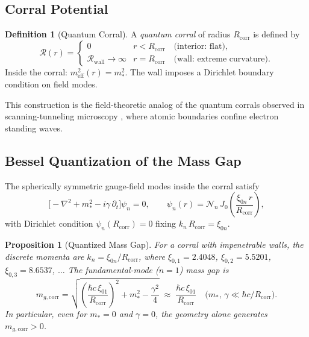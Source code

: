 \documentclass[12pt,a4paper]{article}
\newtheorem{proposition}[theorem]{Proposition}
\theoremstyle{definition}
\newtheorem{definition}[theorem]{Definition}
\newcommand{\mgcorr}{m_{g,\mathrm{corr}}}
\newcommand{\Rcorr}{R_{\mathrm{corr}}}
\newcommand{\meff}{m_{\mathrm{eff}}}
\begin{document}
\subsection{Corral Potential}

\begin{definition}[Quantum Corral]
\label{def:corral}
A \emph{quantum corral} of radius $\Rcorr$ is defined by
\begin{equation}
  \mathcal{R}(r) =
  \begin{cases}
    0 & r < \Rcorr \quad \text{(interior: flat)},\\[4pt]
    \mathcal{R}_{\mathrm{wall}} \to \infty
      & r = \Rcorr \quad \text{(wall: extreme curvature)}.
  \end{cases}
  \label{eq:corral_potential}
\end{equation}
Inside the corral: $\meff^{2}(r) = m_{*}^{2}$.
The wall imposes a Dirichlet boundary condition on field modes.
\end{definition}

This construction is the field-theoretic analog of the quantum corrals
observed in scanning-tunneling microscopy \cite{Crommie1993}, where atomic
boundaries confine electron standing waves.

\subsection{Bessel Quantization of the Mass Gap}

The spherically symmetric gauge-field modes inside the corral satisfy
\begin{equation}
  \bigl[-\nabla^{2} + m_{*}^{2} - i\gamma\,\partial_{t}\bigr]\psi_{n} = 0,
  \qquad
  \psi_{n}(r) = \mathcal{N}_{n}\,J_{0}\!\left(
    \frac{\xi_{0n}\,r}{\Rcorr}
  \right),
  \label{eq:bessel_eq}
\end{equation}
with Dirichlet condition $\psi_{n}(\Rcorr) = 0$ fixing
$k_{n}\,\Rcorr = \xi_{0n}$.

\begin{proposition}[Quantized Mass Gap]
\label{prop:quantized_gap}
For a corral with impenetrable walls, the discrete momenta are
$k_{n} = \xi_{0n}/\Rcorr$, where
$\xi_{0,1} = 2.4048$, $\xi_{0,2} = 5.5201$, $\xi_{0,3} = 8.6537$,
$\ldots$
The fundamental-mode ($n=1$) mass gap is
\begin{equation}
  \boxed{
    \mgcorr = \sqrt{
      \left(\frac{\hbar c\,\xi_{01}}{\Rcorr}\right)^{\!2}
      + m_{*}^{2} - \frac{\gamma^{2}}{4}
    }
    \;\approx\;
    \frac{\hbar c\,\xi_{01}}{\Rcorr}
    \quad
    \bigl(m_{*},\,\gamma \ll \hbar c / \Rcorr\bigr).
  }
  \label{eq:corral_gap}
\end{equation}
In particular, even for $m_{*} = 0$ and $\gamma = 0$, the geometry alone
generates $\mgcorr > 0$.
\end{proposition}
\end{document}

